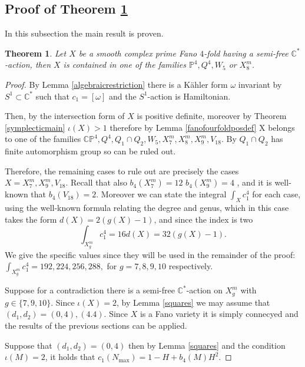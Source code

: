 \documentclass[12pt]{article}
\newtheorem{theorem}{Theorem}[section]
\begin{document}
\subsection{Proof of Theorem \ref{fanomain}}
In this subsection the main result is proven.
\begin{theorem} \label{fanomain}
Let $X$ be a smooth complex prime Fano $4$-fold having a semi-free $\mathbb{C}^*$-action, then $X$ is contained in one of the families $\mathbb{P}^4,Q^4,W_5$ or $X^{m}_{8}$. 
\end{theorem}
\begin{proof}

By  Lemma  \ref{algebraicrestriction}  there is a K\"{a}hler form $\omega$ invariant by $S^1 \subset \mathbb{C}^*$ such that $c_1 = [\omega]$ and the $S^1$-action is Hamiltonian. 

Then, by  \cite[Theorem 3.4]{L2} the intersection form of $X$ is positive definite, moreover by Theorem \ref{symplecticmain} $\iota(X)>1$ therefore by Lemma \ref{fanofourfoldposdef} X belongs to one of the families $\mathbb{CP}^4,Q^4, Q_1 \cap Q_2, W_{5}, X^{m}_{7}, X^{m}_{8},X^{m}_{9}, V_{18}.$ By \cite[Theorem 3.1]{B} $Q_{1} \cap Q_2$ has finite automorphism group so can be ruled out.

Therefore, the remaining cases to rule out are precisely the cases $X = X^{m}_{7},X^{m}_{9},V_{18}$.   Recall that also $b_{4}(X^{m}_{7}) = 12$ \cite[Proposition 5.2]{PZ1}  $b_{4}(X^{m}_{9}) = 4$ \cite[Theorem 2.1]{PZ2}, and it is well-known that $b_{4}(V_{18})=2$. Moreover we can state the integral $\int_{X} c_1^4$ for each case, using the well-known formula relating the degree and genus, which in this case takes the form $d(X) = 2(g(X)-1)$, and since the index is two \begin{equation}\label{degreegenus} \int_{X^{m}_{g}} c_1^4 = 16 d(X) = 32(g(X)-1). \end{equation} We give the specific values since they will be used in the remainder of the proof: $\int_{X^{m}_g} c_1^4 = 192,224,256,288,$ for $g=7,8,9,10$ respectively. 



Suppose for a contradiction there is a semi-free $\mathbb{C}^*$-action on $X_{g}^{m}$ with $ g \in \{7,9,10\}$. Since $\iota(X)=2$, by Lemma \ref{squares} we may assume that $(d_1,d_2)= (0,4), (4.4)$. Since $X$ is a Fano variety it is simply connecyed and the results of the previous sections can be applied.


Suppose that $(d_1,d_2)=(0,4)$ then by Lemma \ref{squares}  and the condition $\iota(M)=2$, it holds that $c_{1}(N_{\max}) = 1 -H + b_{4}(M)H^2$. 


\end{proof}
\end{document}
